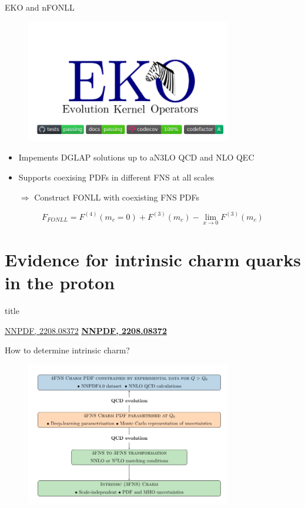 \documentclass[aspectratio=43, 8pt,t]{beamer}
\newcommand{\SectionTitleFrame}[1][]{%
  \begin{frame}
    \vfill
    \centering
    \begin{beamercolorbox}[sep=8pt,center,shadow=true,rounded=true]{title}
      \usebeamerfont{title}\insertsection\par
    \end{beamercolorbox}
    \ifx\relax#1\relax\else
      \vspace{0.5cm}
      \textbf{#1}
    \fi
    \vfill
  \end{frame}
}
\begin{document}
\begin{frame}{EKO and nFONLL}
  \begin{figure}
    \includegraphics[width=0.8\textwidth]{eko_header.png}
  \end{figure}
  \begin{itemize}
    \item Impements DGLAP solutions up to aN3LO QCD and NLO QEC
    \item Supports coexising PDFs in different FNS at all scales
    \item[$\Rightarrow$] Construct FONLL with coexisting FNS PDFs
  \end{itemize}

  $$F_{FONLL} = F^{(4)}(m_c=0) + F^{(3)}(m_c) - \lim_{x\rightarrow 0} F^{(3)}(m_c)$$
\end{frame}


\section*{Evidence for intrinsic charm quarks in the proton}
\SectionTitleFrame[\hyperlink{https://arxiv.org/abs/2208.08372}{NNPDF, 2208.08372}]

\begin{frame}{How to determine intrinsic charm?}
  \begin{figure}
    \includegraphics[width=0.8\textwidth]{ic_strategy.png}
  \end{figure}

\end{frame}
\end{document}
